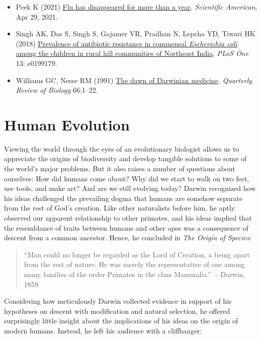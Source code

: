 \documentclass[
]{book}
\begin{document}
\begin{itemize}
\item
  Peek K (2021) \href{https://www.scientificamerican.com/article/flu-has-disappeared-worldwide-during-the-covid-pandemic1/}{Flu has disappeared for more than a year}. \emph{Scientific American}, Apr 29, 2021.
\item
  Singh AK, Das S, Singh S, Gajamer VR, Pradhan N, Lepcha YD, Tiwari HK (2018) \href{https://journals.plos.org/plosone/article?id=10.1371/journal.pone.0199179}{Prevalence of antibiotic resistance in commensal \emph{Escherichia coli} among the children in rural hill communities of Northeast India}. \emph{PLoS One} 13: e0199179.
\item
  Williams GC, Nesse RM (1991) \href{Williams\%20GC,\%20Nesse\%20RM\%20(1991)\%20The\%20dawn\%20of\%20Darwinian\%20medicine.\%20Q\%20Rev\%20Biol\%2066:1–22}{The dawn of Darwinian medicine}. \emph{Quarterly Review of Biology} 66:1--22.
\end{itemize}

\hypertarget{human-evolution}{%
\chapter{Human Evolution}\label{human-evolution}}

Viewing the world through the eyes of an evolutionary biologist allows us to appreciate the origins of biodiversity and develop tangible solutions to some of the world's major problems. But it also raises a number of questions about ourselves: How did humans come about? Why did we start to walk on two feet, use tools, and make art? And are we still evolving today? Darwin recognized how his ideas challenged the prevailing dogma that humans are somehow separate from the rest of God's creation. Like other naturalists before him, he aptly observed our apparent relationship to other primates, and his ideas implied that the resemblance of traits between humans and other apes was a consequence of descent from a common ancestor. Hence, he concluded in \emph{The Origin of Species}:

\begin{quote}
``Man could no longer be regarded as the Lord of Creation, a being apart from the rest of nature. He was merely the representative of one among many families of the order Primates in the class Mammalia.'' ---Darwin, 1859
\end{quote}

Considering how meticulously Darwin collected evidence in support of his hypotheses on descent with modification and natural selection, he offered surprisingly little insight about the implications of his ideas on the origin of modern humans. Instead, he left his audience with a cliffhanger:
\end{document}
